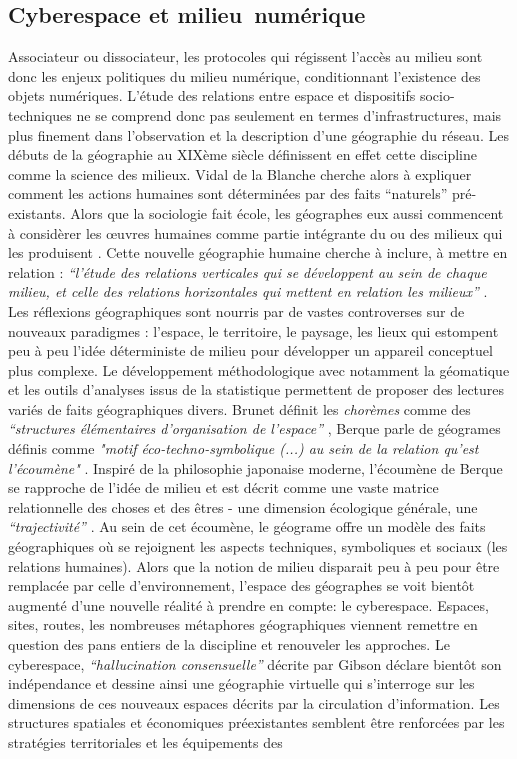 \subsection[Cyberespace et milieu numérique]{Cyberespace et milieu numérique}
Associateur ou dissociateur, les protocoles qui régissent l’accès au milieu sont donc les enjeux politiques du milieu numérique, conditionnant l’existence des objets numériques. L’étude des relations entre espace et dispositifs socio-techniques ne se comprend donc pas seulement en termes d’infrastructures, mais plus finement dans l’observation et la description d’une géographie du réseau. Les débuts de la géographie au XIXème siècle définissent en effet cette discipline comme la science des milieux. Vidal de la Blanche cherche alors à expliquer comment les actions humaines sont déterminées par des faits “naturels” pré-existants. Alors que la sociologie fait école, les géographes eux aussi commencent à considèrer les œuvres humaines comme partie intégrante du ou des milieux qui les produisent \citep{Demangeot1984}. Cette nouvelle géographie humaine cherche à inclure, à mettre en relation : \textit{“l'étude des relations verticales qui se développent au sein de chaque milieu, et celle des relations horizontales qui mettent en relation les milieux”} \citep{Claval1990}. Les réflexions géographiques sont nourris par de vastes controverses sur de nouveaux paradigmes : l'espace, le territoire, le paysage, les lieux qui estompent peu à peu l’idée déterministe de milieu pour développer un appareil conceptuel plus complexe. Le développement méthodologique avec notamment la géomatique et les outils d’analyses issus de la statistique permettent de proposer des lectures variés de faits géographiques divers. Brunet définit les \textit{chorèmes} comme des \textit{“structures élémentaires d'organisation de l'espace”} \citep{Brunet1980}, Berque parle de géogrames définis comme \textit{"motif éco-techno-symbolique (...) au sein de la relation qu'est l'écoumène"} \citep{Berque1999}. Inspiré de la philosophie japonaise moderne, l’écoumène de Berque se rapproche de l’idée de milieu et est décrit comme une vaste matrice relationnelle des choses et des êtres - une dimension écologique générale, une \textit{“trajectivité”} \citep{Watsuji2011}. Au sein de cet écoumène, le géograme offre un modèle des faits géographiques où se rejoignent les aspects techniques, symboliques et sociaux (les relations humaines). Alors que la notion de milieu disparait peu à peu pour être remplacée par celle d’environnement\citep{DAngio2001}, l’espace des géographes se voit bientôt augmenté d’une nouvelle réalité à prendre en compte: le cyberespace. Espaces, sites, routes, les nombreuses métaphores géographiques viennent remettre en question des pans entiers de la discipline et renouveler les approches. Le cyberespace, \textit{“hallucination consensuelle”} décrite par Gibson \citep{Gibson1984} déclare bientôt son indépendance \citep{Barlow2001} et dessine ainsi une géographie virtuelle \citep{Batty1997} qui s’interroge sur les dimensions de ces nouveaux espaces décrits par la circulation d’information. Les structures spatiales et économiques préexistantes semblent être renforcées par les stratégies territoriales et les équipements des 